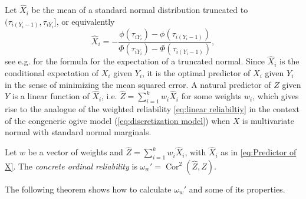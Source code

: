 \documentclass[twoside]{article}
\DeclareMathOperator{\Cor}{Cor}
\begin{document}
Let $\hat{X}_{i}$ be the mean of a standard normal distribution
truncated to $(\tau_{i(Y_{i}-1)},\tau_{iY_{i}}]$, or equivalently
\begin{equation}
\hat{X}_{i}=-\frac{\phi(\tau_{iY_{i}})-\phi(\tau_{i(Y_{i}-1)})}{\Phi(\tau_{iY_{i}})-\Phi(\tau_{i(Y_{i}-1)})},\label{eq:Predictor of X}
\end{equation}
see e.g. \citet[Section 10.1]{Johnson1994-ag} for the formula for the
expectation of a truncated normal. Since $\hat{X}_{i}$ is the
conditional expectation of $X_{i}$ given $Y_{i}$, it is the optimal
predictor of $X_{i}$ given $Y_{i}$ in the sense of minimizing the
mean squared error. A natural predictor of $Z$ given $Y$ is a linear
function of $\hat{X}_{i}$, i.e. $\hat{Z} = \sum_{i=1}^{k}w_{i}\hat{X}_{i}$
for some weights $w_{i}$, which gives rise to the analogue of the
weighted reliability \eqref{eq:linear reliabiltiy} in the context of the congeneric ogive model
(\ref{eq:discretization model}) when $X$ is multivariate normal
with standard normal marginals. 
\begin{defn}\label{defn:concrete ordinal reliability}
Let $w$ be a vector of weights and $\hat{Z}=\sum_{i=1}^{k}w_{i}\hat{X}_{i}$, with $\hat{X}_i$ as in \eqref{eq:Predictor of X}. The \textit{concrete ordinal reliability} is $\omega_{w}'=\Cor^2(\hat{Z},Z)$.
\end{defn}
The following theorem shows how to calculate $\omega_{w}'$ and
some of its properties.
\end{document}
